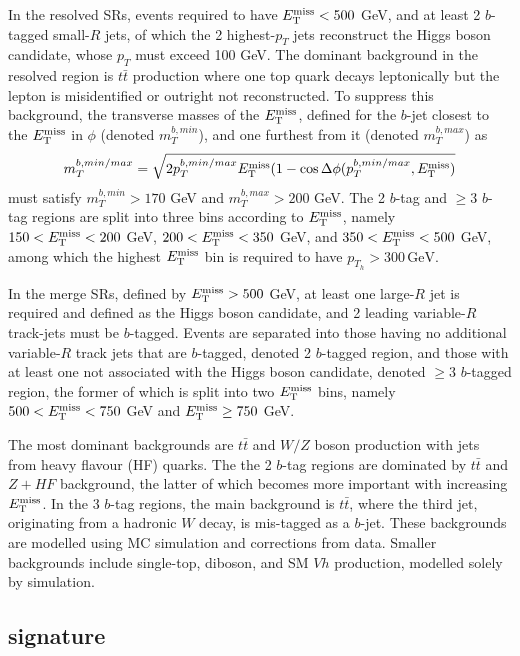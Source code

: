 In the resolved SRs, events required to have $E_{\mathrm{T}}^{\mathrm{miss}}<500 $ GeV, and at least 2 $b$-tagged small-$R$ jets, of which the 2 highest-$p_T$ jets reconstruct the Higgs boson candidate, whose $p_T$ must exceed 100 GeV. The dominant background in the resolved region is $t\bar{t}$ production where one top quark decays leptonically but the lepton is misidentified or outright not reconstructed. To suppress this background, the transverse masses of the $E_{\mathrm{T}}^{\mathrm{miss}}$, defined for the $b$-jet closest to the $E_{\mathrm{T}}^{\mathrm{miss}}$ in $\phi$ (denoted $m_T^{b,min}$), and one furthest from it (denoted $m_T^{b,max}$) as
\begin{equation}
    \label{4.10}
    m_T^{b,min/max} = \sqrt{2p_T^{b,min/max}E_{\mathrm{T}}^{\mathrm{miss}}(1-\cos\Delta\phi(p_T^{b,min/max}, E_{\mathrm{T}}^{\mathrm{miss}})}
\end{equation}
must satisfy $m_T^{b,min} > 170 $ GeV and $m_T^{b,max}>200$ GeV. The 2 $b$-tag and $\ge 3$ $b$-tag regions are split into three bins according to $E_{\mathrm{T}}^{\mathrm{miss}}$, namely $150<E_{\mathrm{T}}^{\mathrm{miss}}<200 $ GeV, $200<E_{\mathrm{T}}^{\mathrm{miss}}<350 $ GeV, and $350<E_{\mathrm{T}}^{\mathrm{miss}}<500 $ GeV, among which the highest $E_{\mathrm{T}}^{\mathrm{miss}}$ bin is required to have  $p_{T_h} > 300\,\mathrm{GeV}$. 

In the merge SRs, defined by $E_{\mathrm{T}}^{\mathrm{miss}}>500$ GeV, at least one large-$R$ jet is required and defined as the Higgs boson candidate, and 2 leading variable-$R$ track-jets must be $b$-tagged. Events are separated into those having no additional variable-$R$ track jets that are $b$-tagged, denoted 2 $b$-tagged region, and those with at least one not associated with the Higgs boson candidate, denoted $\ge3$ $b$-tagged region, the former of which is split into two $E_{\mathrm{T}}^{\mathrm{miss}}$ bins, namely $500<E_{\mathrm{T}}^{\mathrm{miss}}<750 $ GeV and $E_{\mathrm{T}}^{\mathrm{miss}}\ge750$ GeV.

The most dominant backgrounds are $t\bar{t}$ and $W/Z$ boson production with jets from heavy flavour (HF) quarks. The the 2 $b$-tag regions are dominated by $t\bar{t}$ and $Z+HF$ background, the latter of which becomes more important with increasing $E_{\mathrm{T}}^{\mathrm{miss}}$. In the 3 $b$-tag regions, the main background is $t\bar{t}$, where the third jet, originating from a hadronic $W$ decay, is mis-tagged as a $b$-jet. These backgrounds are modelled using MC simulation and corrections from data. Smaller backgrounds include single-top, diboson, and SM $Vh$ production, modelled solely by simulation. 

\subsection{\texorpdfstring{\monohgamgam}{TEXT} signature}

